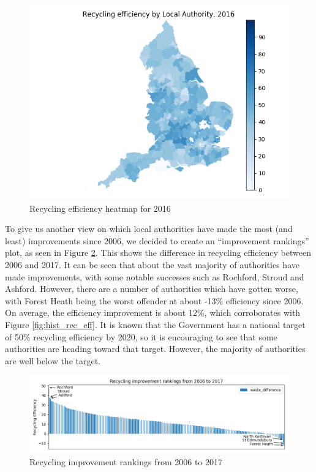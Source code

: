 \documentclass[11pt,conference]{IEEEtran}
\begin{document}
\begin{figure}
    \centering
    \includegraphics[width=\linewidth]{../figures/england_recycling_heatmap_efficiency2016.png}
    \caption{Recycling efficiency heatmap for 2016}
    \label{fig:heatmap2016}
\end{figure}



To give us another view on which local authorities have made the most (and least) improvements since 2006, we decided to create an “improvement rankings” plot, as seen in Figure \ref{fig:rec_improvement_rankings}. This shows the difference in recycling efficiency between 2006 and 2017. It can be seen that about the vast majority of authorities have made improvements, with some notable successes such as Rochford, Stroud and Ashford. However, there are a number of authorities which have gotten worse, with Forest Heath being the worst offender at about -13\% efficiency since 2006. On average, the efficiency improvement is about 12\%, which corroborates with Figure \ref{fig:hist_rec_eff}. It is known that the Government has a national target of 50\% recycling efficiency by 2020, so it is encouraging to see that some authorities are heading toward that target. However, the majority of authorities are well below the target.


\begin{figure}[htbp]
    \begin{center}
        \includegraphics[width=\linewidth]{../figures/england_historical_recycling_improvement_rankings.png}
    \caption{Recycling improvement rankings from 2006 to 2017}
    \label{fig:rec_improvement_rankings}
    \end{center}
\end{figure}
\end{document}
